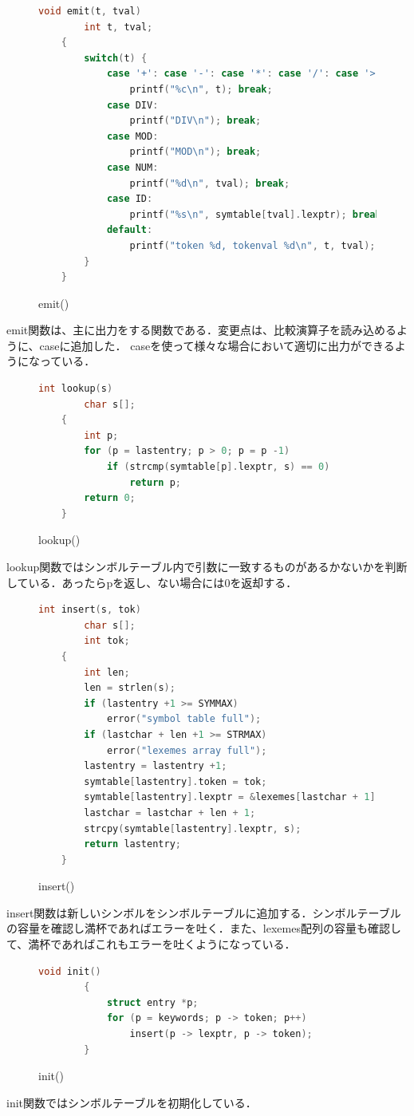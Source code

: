 \documentclass[fleqn, a4paper. 12pt]{ltjsarticle} %
\begin{document}
  \begin{figure}[H]
	\centering
	\begin{lstlisting}[language=C, caption={}, label=sample-code]
		void emit(t, tval)
		int t, tval;
	{
		switch(t) {
			case '+': case '-': case '*': case '/': case '>': case '<' : case '=':
				printf("%c\n", t); break;
			case DIV:
				printf("DIV\n"); break;
			case MOD:
				printf("MOD\n"); break;
			case NUM:
				printf("%d\n", tval); break;
			case ID:
				printf("%s\n", symtable[tval].lexptr); break;
			default:
				printf("token %d, tokenval %d\n", t, tval); break;
		}
	}
	\end{lstlisting}
	\caption{emit()}
	\label{emit}
  \end{figure}
  emit関数は、主に出力をする関数である．変更点は、比較演算子を読み込めるように、caseに追加した．
  caseを使って様々な場合において適切に出力ができるようになっている．

  \begin{figure}[H]
	\centering
	\begin{lstlisting}[language=C, caption={}, label=sample-code]
		int lookup(s)
		char s[];
	{
		int p;
		for (p = lastentry; p > 0; p = p -1)
			if (strcmp(symtable[p].lexptr, s) == 0)
				return p;
		return 0;
	}
	\end{lstlisting}
	\caption{lookup()}
	\label{lookup}
  \end{figure}
  lookup関数ではシンボルテーブル内で引数に一致するものがあるかないかを判断している．あったらpを返し、ない場合には$0$を返却する．

  \begin{figure}[H]
	\centering
	\begin{lstlisting}[language=C, caption={}, label=sample-code]
		int insert(s, tok)
		char s[];
		int tok;
	{
		int len;
		len = strlen(s);
		if (lastentry +1 >= SYMMAX)
			error("symbol table full");
		if (lastchar + len +1 >= STRMAX)
			error("lexemes array full");
		lastentry = lastentry +1;
		symtable[lastentry].token = tok;
		symtable[lastentry].lexptr = &lexemes[lastchar + 1];
		lastchar = lastchar + len + 1;
		strcpy(symtable[lastentry].lexptr, s);
		return lastentry;
	}
	\end{lstlisting}
	\caption{insert()}
	\label{insert}
  \end{figure}
  insert関数は新しいシンボルをシンボルテーブルに追加する．シンボルテーブルの容量を確認し満杯であればエラーを吐く．また、lexemes配列の容量も確認して、満杯であればこれもエラーを吐くようになっている．

  \begin{figure}[H]
	\centering
	\begin{lstlisting}[language=C, caption={}, label=sample-code]
		void init()
		{
			struct entry *p;
			for (p = keywords; p -> token; p++)
				insert(p -> lexptr, p -> token);
		}
	\end{lstlisting}
	\caption{init()}
	\label{init}
  \end{figure}
  init関数ではシンボルテーブルを初期化している．
\end{document}
